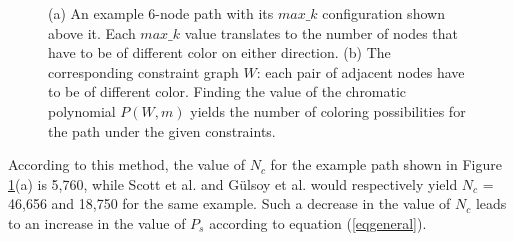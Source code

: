 \documentclass{ws-procs11x85}
\begin{document}
\begin{figure}[h]
\centerline{}
\caption{(a) An example 6-node path with its $max\_k$ configuration shown above
it. Each $max\_k$ value translates to the number of nodes that have to be of
different color on either direction. (b) The corresponding constraint graph $W$:
each pair of adjacent nodes have to be of different color. Finding the value of
the chromatic polynomial $P(W, m)$ yields the number of coloring possibilities
for the path under the given constraints.}
\label{maxk}
\end{figure}

According to this method, the value of $N_c$ for the example path shown in
Figure \ref{maxk}(a) is 5,760, while Scott et al.\cite{scott} and G{\"u}lsoy et
al.\cite{gulsoy} would respectively yield $N_c$ = 46,656 and 18,750 for the same
example. Such a decrease in the value of $N_c$ leads to an increase in the value
of $P_s$ according to equation (\ref{eqgeneral}).
\end{document}
